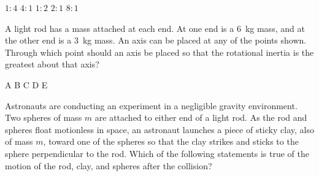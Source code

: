 \documentclass{../../../oss-ap12ibhl}
\begin{document}
\begin{questions}
  \begin{minipage}{.35\linewidth}
    \end{minipage}
  \begin{minipage}{.3\linewidth}
    \begin{choices}
      \choice $1:4$
      \choice $4:1$
      \choice $1:2$
      \choice $2:1$
      \choice $8:1$
    \end{choices}
  \end{minipage}
  
  \question A light rod has a mass attached at each end. At one end is a
  \SI{6}{\kilo\gram} mass, and at the other end is a \SI{3}{\kilo\gram} mass.
  An axis can be placed at any of the points shown. Through which point should
  an axis be placed so that the rotational inertia is the greatest about that
  axis?
  \begin{center}
  \end{center}
  \begin{oneparchoices}
    \choice A\hspace{.4in}
    \choice B\hspace{.4in}
    \choice C\hspace{.4in}
    \choice D\hspace{.4in}
    \choice E
  \end{oneparchoices}
  \vspace{.2in}
    
  \question Astronauts are conducting an experiment in a negligible gravity
  environment. Two spheres of mass $m$ are attached to either end of a light
  rod. As the rod and spheres float motionless in space, an astronaut launches
  a piece of sticky clay, also of mass $m$, toward one of the spheres so that
  the clay strikes and sticks to the sphere perpendicular to the rod. Which of
  the following statements is true of the motion of the rod, clay, and spheres
  after the collision?


\end{questions}
\end{document}
